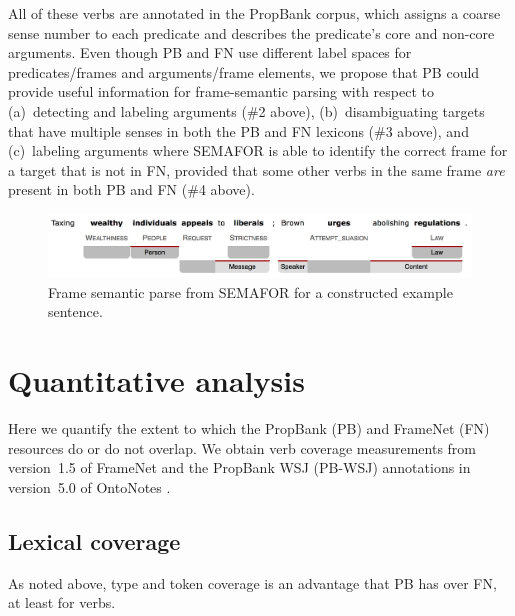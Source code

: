 \documentclass[11pt]{article}
\begin{document}
All of these verbs are annotated in the PropBank corpus, which assigns a coarse sense number 
to each predicate and describes the predicate's core and non-core arguments. 
Even though PB and FN use different label spaces for predicates/frames and 
arguments/frame elements, we propose that PB could provide useful information for frame-semantic parsing 
with respect to (a)~detecting and labeling arguments (\#2 above),  
(b)~disambiguating targets that have multiple senses in both the PB and FN lexicons (\#3 above), and
(c)~labeling arguments where SEMAFOR is able to identify the correct frame for a target that is not in FN, 
provided that some other verbs in the same frame \emph{are} present in both PB and FN (\#4 above).

\begin{figure}\centering
\includegraphics[width=.8\textwidth]{tax_example_short.jpg}
\caption{Frame semantic parse from SEMAFOR for a constructed example sentence.}
\label{fig:semaforOutput}
\end{figure}

\section{Quantitative analysis}\label{sec:quant}

Here we quantify the extent to which the PropBank (PB) and FrameNet (FN) resources 
do or do not overlap. We obtain verb coverage measurements from version~1.5 of FrameNet 
and the PropBank WSJ (PB-WSJ) annotations in version~5.0 of OntoNotes \citep{ontonotes}. 

\subsection{Lexical coverage}\label{sec:coverage}


As noted above, type and token coverage is an advantage that PB has over FN, at least for verbs.
\end{document}
